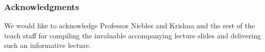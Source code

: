 \documentclass{article}
\begin{document}
\subsubsection*{Acknowledgments}
We would like to acknowledge Professor Niebles and Krishna and the rest of the teach staff for compiling the invaluable accompanying lecture slides and delivering such an informative lecture. 


\small
%

%
\end{document}

